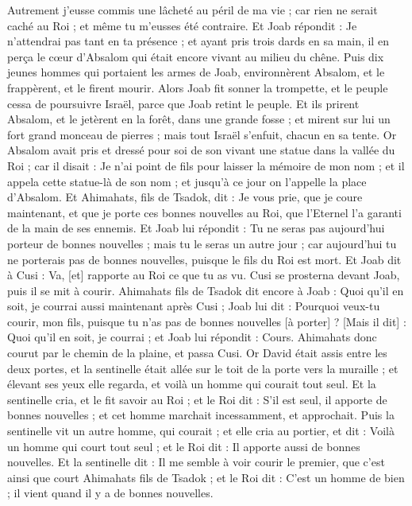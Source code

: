 \begin{multicols}{2}
Autrement j'eusse commis une lâcheté au péril de ma vie ; car rien ne serait caché au Roi ; et même tu m'eusses été contraire.
Et Joab répondit : Je n'attendrai pas tant en ta présence ; et ayant pris trois dards en sa main, il en perça le cœur d'Absalom qui était encore vivant au milieu du chêne.
Puis dix jeunes hommes qui portaient les armes de Joab, environnèrent Absalom, et le frappèrent, et le firent mourir.
Alors Joab fit sonner la trompette, et le peuple cessa de poursuivre Israël, parce que Joab retint le peuple.
Et ils prirent Absalom, et le jetèrent en la forêt, dans une grande fosse ; et mirent sur lui un fort grand monceau de pierres ; mais tout Israël s'enfuit, chacun en sa tente.
Or Absalom avait pris et dressé pour soi de son vivant une statue dans la vallée du Roi ; car il disait : Je n'ai point de fils pour laisser la mémoire de mon nom ; et il appela cette statue-là de son nom ; et jusqu'à ce jour on l'appelle la place d'Absalom.
Et Ahimahats, fils de Tsadok, dit : Je vous prie, que je coure maintenant, et que je porte ces bonnes nouvelles au Roi, que l'Eternel l'a garanti de la main de ses ennemis.
Et Joab lui répondit : Tu ne seras pas aujourd'hui porteur de bonnes nouvelles ; mais tu le seras un autre jour ; car aujourd'hui tu ne porterais pas de bonnes nouvelles, puisque le fils du Roi est mort.
Et Joab dit à Cusi : Va, [et] rapporte au Roi ce que tu as vu. Cusi se prosterna devant Joab, puis il se mit à courir.
Ahimahats fils de Tsadok dit encore à Joab : Quoi qu'il en soit, je courrai aussi maintenant après Cusi ; Joab lui dit : Pourquoi veux-tu courir, mon fils, puisque tu n'as pas de bonnes nouvelles [à porter] ?
[Mais il dit] : Quoi qu'il en soit, je courrai ; et Joab lui répondit : Cours. Ahimahats donc courut par le chemin de la plaine, et passa Cusi.
Or David était assis entre les deux portes, et la sentinelle était allée sur le toit de la porte vers la muraille ; et élevant ses yeux elle regarda, et voilà un homme qui courait tout seul.
Et la sentinelle cria, et le fit savoir au Roi ; et le Roi dit : S'il est seul, il apporte de bonnes nouvelles ; et cet homme marchait incessamment, et approchait.
Puis la sentinelle vit un autre homme, qui courait ; et elle cria au portier, et dit : Voilà un homme qui court tout seul ; et le Roi dit : Il apporte aussi de bonnes nouvelles.
Et la sentinelle dit : Il me semble à voir courir le premier, que c'est ainsi que court Ahimahats fils de Tsadok ; et le Roi dit : C'est un homme de bien ; il vient quand il y a de bonnes nouvelles.

\end{multicols}
